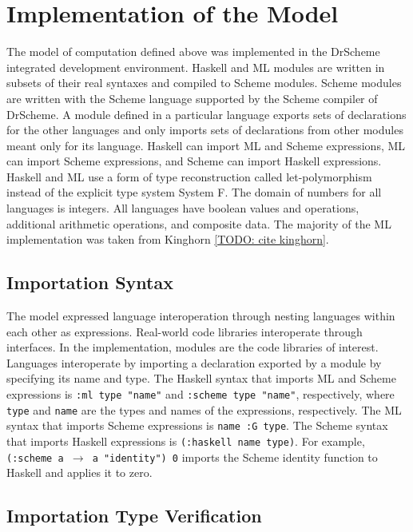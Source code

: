 \chapter{Implementation of the Model}

The model of computation defined above was implemented in the DrScheme integrated development environment.  Haskell and ML modules are written in subsets of their real syntaxes and compiled to Scheme modules.  Scheme modules are written with the Scheme language supported by the Scheme compiler of DrScheme.  A module defined in a particular language exports sets of declarations for the other languages and only imports sets of declarations from other modules meant only for its language.  Haskell can import ML and Scheme expressions, ML can import Scheme expressions, and Scheme can import Haskell expressions.  Haskell and ML use a form of type reconstruction called let-polymorphism instead of the explicit type system System F.  The domain of numbers for all languages is integers.  All languages have boolean values and operations, additional arithmetic operations, and composite data.  The majority of the ML implementation was taken from Kinghorn \ref{TODO: cite kinghorn}.

\section{Importation Syntax}

The model expressed language interoperation through nesting languages within each other as expressions.  Real-world code libraries interoperate through interfaces.  In the implementation, modules are the code libraries of interest.  Languages interoperate by importing a declaration exported by a module by specifying its name and type.  The Haskell syntax that imports ML and Scheme expressions is \texttt{:ml type "name"} and \texttt{:scheme type "name"}, respectively, where \texttt{type} and \texttt{name} are the types and names of the expressions, respectively.  The ML syntax that imports Scheme expressions is \texttt{name :G type}.  The Scheme syntax that imports Haskell expressions is \texttt{(:haskell name type)}.  For example, \texttt{(:scheme a $\rightarrow$ a "identity") 0} imports the Scheme identity function to Haskell and applies it to zero.

\section{Importation Type Verification}

